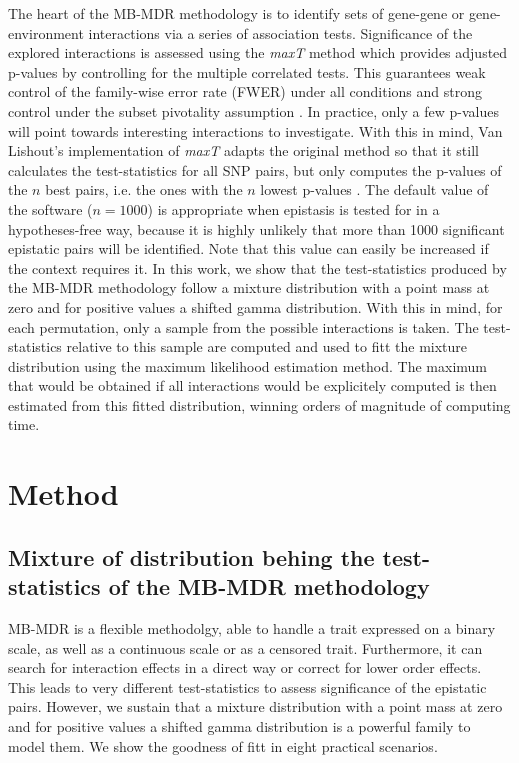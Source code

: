 \documentclass{bmcart}
\begin{document}
The heart of the MB-MDR methodology is to identify sets of gene-gene or gene-environment interactions via a series of association tests. Significance of the explored interactions is assessed using the {\em maxT} method \cite{Westfall1993} which provides adjusted p-values by controlling for the multiple correlated tests. This guarantees weak control of the family-wise error rate (FWER) under all conditions and strong control under the subset pivotality assumption \cite{Ge2003}. In practice, only a few p-values will point towards interesting interactions to investigate. With this in mind, Van Lishout's implementation of {\em maxT} adapts the original method so that it still calculates the test-statistics for all SNP pairs, but only computes the p-values of the $n$ best pairs, i.e. the ones with the $n$ lowest p-values \cite{VanLishout2013}. The default value of the software ($n = 1000$) is appropriate when epistasis is tested for in a hypotheses-free way, because it is highly unlikely that more than 1000 significant epistatic pairs will be identified. Note that this value can easily be increased if the context requires it. In this work, we show that the test-statistics produced by the MB-MDR methodology follow a mixture distribution with a point mass at zero and for positive values a shifted gamma distribution. With this in mind, for each permutation, only a sample from the possible interactions is taken. The test-statistics relative to this sample are computed and used to fitt the mixture distribution using the maximum likelihood estimation method. The maximum that would be obtained if all interactions would be explicitely computed is then estimated from this fitted distribution, winning orders of magnitude of computing time.

\section*{Method}

\subsection*{Mixture of distribution behing the test-statistics of the MB-MDR methodology}

MB-MDR is a flexible methodolgy, able to handle a trait expressed on a binary scale, as well as a continuous scale or as a censored trait. Furthermore, it can search for interaction effects in a direct way or correct for lower order effects. This leads to very different test-statistics to assess significance of the epistatic pairs. However, we sustain that a mixture distribution with a point mass at zero and for positive values a shifted gamma distribution is a powerful family to model them. We show the goodness of fitt in eight practical scenarios.
\end{document}
